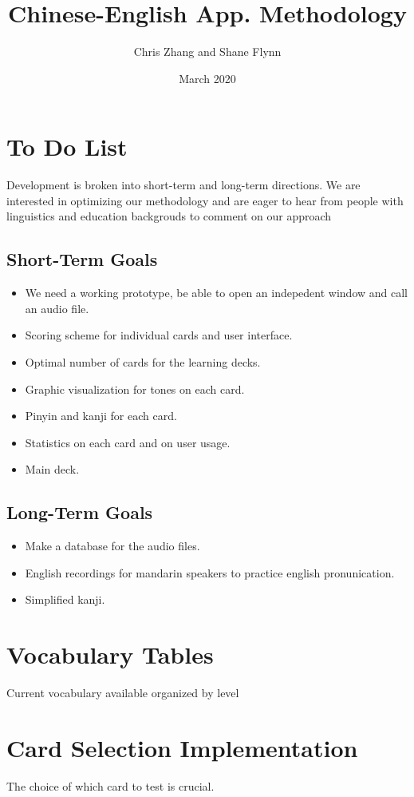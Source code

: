 \documentclass{article}
\title{Chinese-English App. Methodology}
\author{Chris Zhang and Shane Flynn}
\date{March 2020}
\begin{document}
\section*{To Do List}
Development is broken into short-term and long-term directions.
We are interested in optimizing our methodology and are eager to hear from
people with linguistics and education backgrouds to comment on our approach

\subsection*{Short-Term Goals}
\begin{itemize}
  \item  We need a working prototype, be able to open an indepedent window and
  call an audio file.
  \item Scoring scheme for individual cards and user interface.
  \item Optimal number of cards for the learning decks.
  \item Graphic visualization for tones on each card.
  \item Pinyin and kanji for each card.
  \item Statistics on each card and on user usage.
  \item Main deck.
\end{itemize}

\subsection*{Long-Term Goals}
\begin{itemize}
  \item Make a database for the audio files.
  \item English recordings for mandarin speakers to practice english
  pronunication.
  \item Simplified kanji.
\end{itemize}

\section*{Vocabulary Tables}
Current vocabulary available organized by level

\section*{Card Selection Implementation}
The choice of which card to test is crucial.
\end{document}
